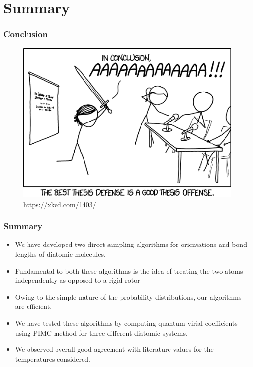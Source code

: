\documentclass[xcolor=svgnames]{beamer}
\begin{document}
	\section{Summary}
        \begin{frame}
            \frametitle{Conclusion}
            \begin{figure}[!htbp]
                \centering
                \includegraphics[scale=0.6,keepaspectratio]{thesis_defense.png}
                \caption{\tiny{https://xkcd.com/1403/}}
            \end{figure}
        \end{frame}
        \begin{frame}
            \frametitle{Summary}
            \begin{itemize}
                \item We have developed two direct sampling algorithms for orientations and bond-lengths of diatomic molecules.
                \item Fundamental to both these algorithms is the idea of treating the two atoms independently as opposed to a rigid rotor.
                \item Owing to the simple nature of the probability distributions, our algorithms are efficient.
                \item We have tested these algorithms by computing quantum virial coefficients using PIMC method for three different diatomic systems.
                \item We observed overall good agreement with literature values for the temperatures considered.
            \end{itemize}
        \end{frame}
\end{document}
